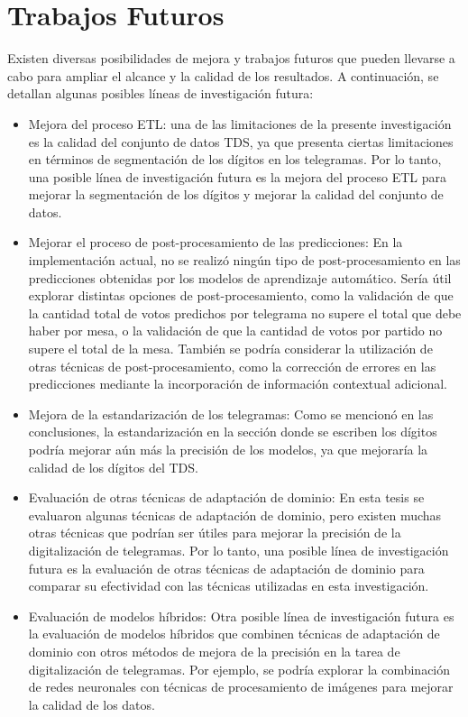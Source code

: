 \section{Trabajos Futuros}

Existen diversas posibilidades de mejora y trabajos futuros que pueden llevarse a cabo para ampliar el alcance y la
calidad de los resultados. A continuación, se detallan algunas posibles líneas de investigación futura:

\begin{itemize}
      \item Mejora del proceso ETL: una de las limitaciones de la presente investigación es la calidad del conjunto de datos TDS,
            ya que presenta ciertas limitaciones en términos de segmentación de los dígitos en los telegramas. Por lo tanto, una
            posible línea de investigación futura es la mejora del proceso ETL para mejorar la segmentación de los dígitos y
            mejorar la calidad del conjunto de datos.
      \item Mejorar el proceso de post-procesamiento de las predicciones: En la implementación actual, no se realizó ningún tipo de
            post-procesamiento en las predicciones obtenidas por los modelos de aprendizaje automático. Sería útil explorar
            distintas opciones de post-procesamiento, como la validación de que la cantidad total de votos predichos por telegrama
            no supere el total que debe haber por mesa, o la validación de que la cantidad de votos por partido no supere el total
            de la mesa. También se podría considerar la utilización de otras técnicas de post-procesamiento, como la corrección de
            errores en las predicciones mediante la incorporación de información contextual adicional.
      \item Mejora de la estandarización de los telegramas: Como se mencionó en las conclusiones, la estandarización en la sección
            donde se escriben los dígitos podría mejorar aún más la precisión de los modelos, ya que mejoraría la calidad de los
            dígitos del TDS.
      \item Evaluación de otras técnicas de adaptación de dominio: En esta tesis se evaluaron algunas técnicas de adaptación de
            dominio, pero existen muchas otras técnicas que podrían ser útiles para mejorar la precisión de la digitalización de
            telegramas. Por lo tanto, una posible línea de investigación futura es la evaluación de otras técnicas de adaptación de
            dominio para comparar su efectividad con las técnicas utilizadas en esta investigación.
      \item Evaluación de modelos híbridos: Otra posible línea de investigación futura es la evaluación de modelos híbridos que
            combinen técnicas de adaptación de dominio con otros métodos de mejora de la precisión en la tarea de digitalización de
            telegramas. Por ejemplo, se podría explorar la combinación de redes neuronales con técnicas de procesamiento de
            imágenes para mejorar la calidad de los datos.
\end{itemize}

